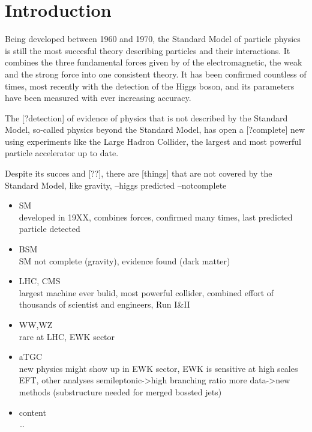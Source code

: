 \chapter*{Introduction}
Being developed between 1960 and 1970, the Standard Model of particle physics is still the most succesful theory describing particles and their interactions. It combines the three fundamental forces given by of the electromagnetic, the weak and the strong force into one consistent theory. It has been confirmed countless of times, most recently with the detection of the Higgs boson, and its parameters have been measured with ever increasing accuracy. 

The [?detection] of evidence of physics that is not described by the Standard Model, so-called physics beyond the Standard Model, has open a [?complete] new 
using experiments like the Large Hadron Collider, the largest and most powerful particle accelerator up to date.

Despite its succes and [??], there are [things] that are not covered by the Standard Model, like gravity, 
--higgs predicted --notcomplete
\begin{itemize}

\item{SM}\\
developed in 19XX, combines forces, confirmed many times, last predicted particle detected

\item{BSM}\\
SM not complete (gravity), evidence found (dark matter)

\item{LHC, CMS}\\
largest machine ever bulid, most powerful collider, combined effort of thousands of scientist and engineers, Run I&II

\item{WW,WZ}\\
rare at LHC, EWK sector

\item{aTGC}\\
new physics might show up in EWK sector, EWK is sensitive at high scales EFT, other analyses
semileptonic->high branching ratio
more data->new methods (substructure needed for merged bossted jets)

\item{content}\\
\dots
\end{itemize}
